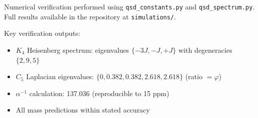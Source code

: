 \documentclass[11pt,a4paper]{article}
\theoremstyle{definition}
\begin{document}
Numerical verification performed using \texttt{qsd\_constants.py} and \texttt{qsd\_spectrum.py}. Full results available in the repository at \texttt{simulations/}.

Key verification outputs:
\begin{itemize}[nosep]
    \item $K_4$ Heisenberg spectrum: eigenvalues $\{-3J, -J, +J\}$ with degeneracies $\{2, 9, 5\}$
    \item $C_5$ Laplacian eigenvalues: $\{0, 0.382, 0.382, 2.618, 2.618\}$ (ratio $= \varphi$)
    \item $\alpha^{-1}$ calculation: 137.036 (reproducible to 15 ppm)
    \item All mass predictions within stated accuracy
\end{itemize}

\end{document}
